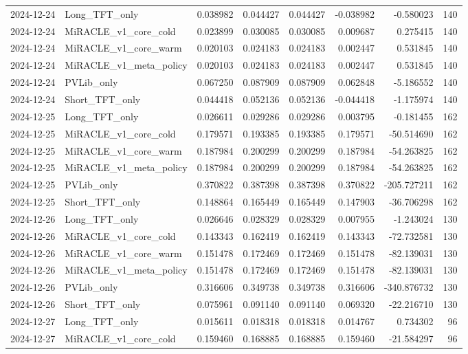 \begin{tabular}{llrrrrrr}
2024-12-24 & Long_TFT_only & 0.038982 & 0.044427 & 0.044427 & -0.038982 & -0.580023 & 140 \\
2024-12-24 & MiRACLE_v1_core_cold & 0.023899 & 0.030085 & 0.030085 & 0.009687 & 0.275415 & 140 \\
2024-12-24 & MiRACLE_v1_core_warm & 0.020103 & 0.024183 & 0.024183 & 0.002447 & 0.531845 & 140 \\
2024-12-24 & MiRACLE_v1_meta_policy & 0.020103 & 0.024183 & 0.024183 & 0.002447 & 0.531845 & 140 \\
2024-12-24 & PVLib_only & 0.067250 & 0.087909 & 0.087909 & 0.062848 & -5.186552 & 140 \\
2024-12-24 & Short_TFT_only & 0.044418 & 0.052136 & 0.052136 & -0.044418 & -1.175974 & 140 \\
2024-12-25 & Long_TFT_only & 0.026611 & 0.029286 & 0.029286 & 0.003795 & -0.181455 & 162 \\
2024-12-25 & MiRACLE_v1_core_cold & 0.179571 & 0.193385 & 0.193385 & 0.179571 & -50.514690 & 162 \\
2024-12-25 & MiRACLE_v1_core_warm & 0.187984 & 0.200299 & 0.200299 & 0.187984 & -54.263825 & 162 \\
2024-12-25 & MiRACLE_v1_meta_policy & 0.187984 & 0.200299 & 0.200299 & 0.187984 & -54.263825 & 162 \\
2024-12-25 & PVLib_only & 0.370822 & 0.387398 & 0.387398 & 0.370822 & -205.727211 & 162 \\
2024-12-25 & Short_TFT_only & 0.148864 & 0.165449 & 0.165449 & 0.147903 & -36.706298 & 162 \\
2024-12-26 & Long_TFT_only & 0.026646 & 0.028329 & 0.028329 & 0.007955 & -1.243024 & 130 \\
2024-12-26 & MiRACLE_v1_core_cold & 0.143343 & 0.162419 & 0.162419 & 0.143343 & -72.732581 & 130 \\
2024-12-26 & MiRACLE_v1_core_warm & 0.151478 & 0.172469 & 0.172469 & 0.151478 & -82.139031 & 130 \\
2024-12-26 & MiRACLE_v1_meta_policy & 0.151478 & 0.172469 & 0.172469 & 0.151478 & -82.139031 & 130 \\
2024-12-26 & PVLib_only & 0.316606 & 0.349738 & 0.349738 & 0.316606 & -340.876732 & 130 \\
2024-12-26 & Short_TFT_only & 0.075961 & 0.091140 & 0.091140 & 0.069320 & -22.216710 & 130 \\
2024-12-27 & Long_TFT_only & 0.015611 & 0.018318 & 0.018318 & 0.014767 & 0.734302 & 96 \\
2024-12-27 & MiRACLE_v1_core_cold & 0.159460 & 0.168885 & 0.168885 & 0.159460 & -21.584297 & 96 \\

\end{tabular}
